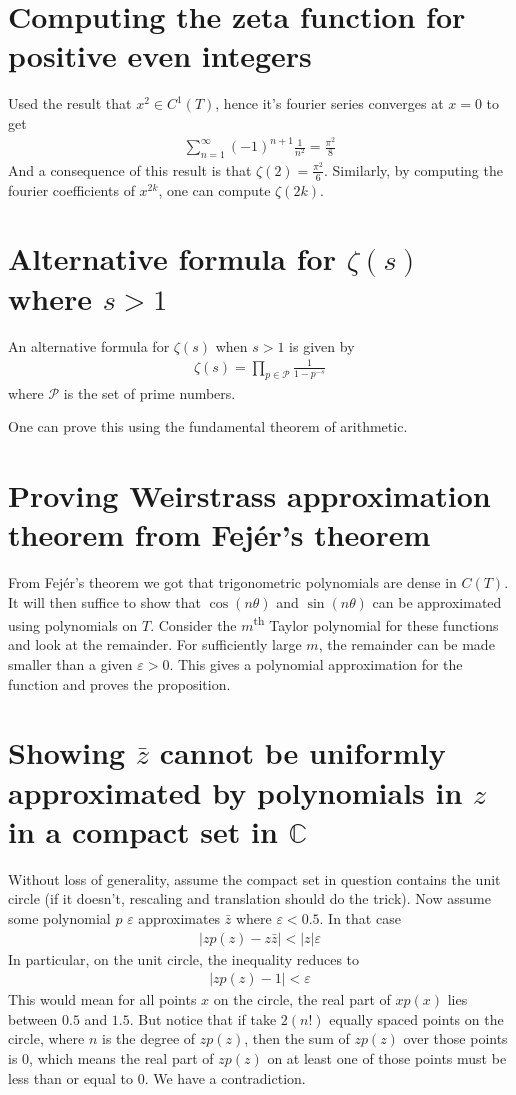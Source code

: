 \documentclass{article}
\theoremstyle{definition}
\begin{document}
\section{Computing the zeta function for positive even integers}
Used the result that $x^2 \in C^1(T)$, hence it's fourier series converges at $x=0$ to get
\begin{align*}
    \sum_{n=1}^{\infty} (-1)^{n+1}\frac{1}{n^2} = \frac{\pi^2}{8}
\end{align*}
And a consequence of this result is that $\zeta(2) = \frac{\pi^2}{6}$. Similarly, by computing the fourier coefficients of $x^{2k}$, one can compute $\zeta(2k)$.

\section{Alternative formula for $\zeta(s)$ where $s > 1$}
An alternative formula for $\zeta(s)$ when $s>1$ is given by
\begin{align*}
    \zeta(s) = \prod_{p \in \mathcal{P}} \frac{1}{1 - p^{-s}}
\end{align*}
where $\mathcal{P}$ is the set of prime numbers.

One can prove this using the fundamental theorem of arithmetic.

\section{Proving Weirstrass approximation theorem from Fejér's theorem}
From Fejér's theorem we got that trigonometric polynomials are dense in $C(T)$. It will then suffice to show that $\cos(n\theta)$ and $\sin(n\theta)$ can be approximated using polynomials on $T$. Consider the $m$\textsuperscript{th} Taylor polynomial for these functions and look at the remainder. For sufficiently large $m$, the remainder can be made smaller than a given $\varepsilon > 0$. This gives a polynomial approximation for the function and proves the proposition.

\section{Showing $\bar{z}$ cannot be uniformly approximated by polynomials in $z$ in a compact set in $\mathbb{C}$}
Without loss of generality, assume the compact set in question contains the unit circle (if it doesn't, rescaling and translation should do the trick). Now assume some polynomial $p$ $\varepsilon$ approximates $\bar{z}$ where $\varepsilon < 0.5$. In that case
\begin{align*}
    |zp(z) - z\bar{z}| < |z|\varepsilon
\end{align*}
In particular, on the unit circle, the inequality reduces to
\begin{align*}
    |zp(z) - 1| < \varepsilon
\end{align*}
This would mean for all points $x$ on the circle, the real part of $xp(x)$ lies between $0.5$ and $1.5$. But notice that if take $2(n!)$ equally spaced points on the circle, where $n$ is the degree of $zp(z)$, then the sum of $zp(z)$ over those points is $0$, which means the real part of $zp(z)$ on at least one of those points must be less than or equal to $0$. We have a contradiction.
\end{document}
